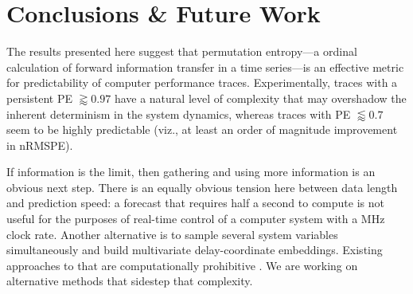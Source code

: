 \documentclass{article}
\begin{document}

\section{ Conclusions \& Future Work}\label{sec:conc}

The results presented here suggest that permutation entropy---a
ordinal calculation of forward information transfer in a time
series---is an effective metric for predictability of computer
performance traces. Experimentally, traces with a persistent PE
$\gtrapprox 0.97$ have a natural level of complexity that may
overshadow the inherent determinism in the system dynamics, whereas
traces with PE $\lessapprox 0.7$ seem to be highly predictable (viz.,
at least an order of magnitude improvement in nRMSPE).

If information is the limit, then gathering and using more information
is an obvious next step.  There is an equally obvious tension here
between data length and prediction speed: a forecast that requires
half a second to compute is not useful for the purposes of real-time
control of a computer system with a MHz clock rate.  Another
alternative is to sample several system variables simultaneously and
build multivariate delay-coordinate embeddings.  Existing approaches
to that are computationally prohibitive
\cite{cao-multivariate-embedding}.  We are working on alternative
methods that sidestep that complexity.



\end{document}

